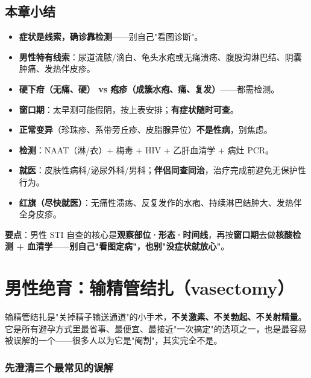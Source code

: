 \documentclass[12pt,UTF8,openany]{ctexbook}
\begin{document}
\section{本章小结}
\begin{itemize}[leftmargin=2em,itemsep=0.2em]
  \item \textbf{症状是线索，确诊靠检测}——别自己"看图诊断"。
  \item \textbf{男性特有线索}：尿道流脓/滴白、龟头水疱或无痛溃疡、腹股沟淋巴结、阴囊肿痛、发热伴皮疹。
  \item \textbf{硬下疳（无痛、硬） vs 疱疹（成簇水疱、痛、复发）}——都需检测。
  \item \textbf{窗口期}：太早测可能假阴，按上表安排；\textbf{有症状随时可查}。
  \item \textbf{正常变异}（珍珠疹、系带旁丘疹、皮脂腺异位）\textbf{不是性病}，别焦虑。
  \item \textbf{检测}：NAAT（淋/衣）+ 梅毒 + HIV + 乙肝血清学 + 病灶 PCR。
  \item \textbf{就医}：皮肤性病科/泌尿外科/男科；\textbf{伴侣同查同治}，治疗完成前避免无保护性行为。
  \item \textbf{红旗（尽快就医）}：无痛性溃疡、反复发作的水疱、持续淋巴结肿大、发热伴全身皮疹。
\end{itemize}

\vspace{1em}
\noindent\textbf{要点}：男性 STI 自查的核心是\textbf{观察部位·形态·时间线}，再按\textbf{窗口期}去做\textbf{核酸检测 + 血清学}——\textbf{别自己"看图定病"，也别"没症状就放心"}。

\chapter{男性绝育：输精管结扎（vasectomy）}
\label{chap:vasectomy}

输精管结扎是"关掉精子输送通道"的小手术，\textbf{不关激素、不关勃起、不关射精量}。它是所有避孕方式里最省事、最便宜、最接近"一次搞定"的选项之一，也是最容易被误解的一个——很多人以为它是"阉割"，其实完全不是。

\subsection*{先澄清三个最常见的误解}
\end{document}
